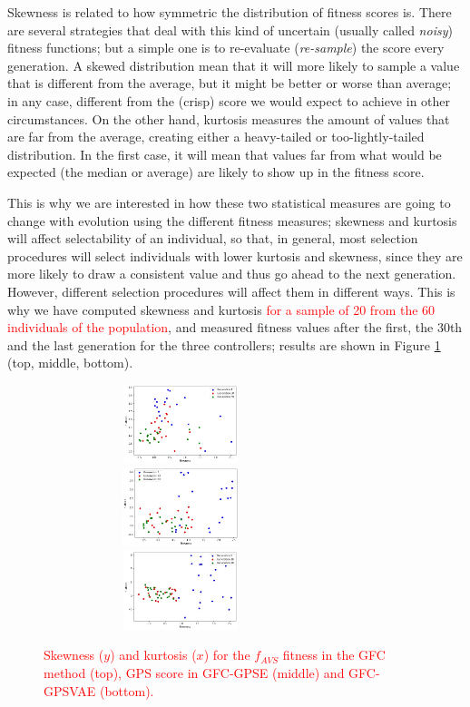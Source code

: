 \documentclass[10pt,journal,compsoc]{IEEEtran}
\begin{document}
Skewness is related to how symmetric the distribution of fitness
scores is. There are several strategies that deal with this kind of
uncertain (usually called {\em noisy}) fitness functions; but a simple
one is to re-evaluate ({\em re-sample}) the score every generation. A
skewed distribution mean that it will more likely to sample a value
that is different from the average, but it might be better or worse
than average; in any case, different from the (crisp) score we would expect to
achieve in other circumstances. On the other hand, kurtosis measures
the amount of values that are far from the average, creating either a
heavy-tailed or too-lightly-tailed distribution. In the first case, it
will mean that values far from what would be expected (the median or average) are likely to
show up in the fitness score.

This is why we are interested in how these two statistical measures
are going to change with evolution using the different fitness measures; skewness and kurtosis will  affect
selectability of an individual, so that, in general, most selection procedures will select
individuals with lower kurtosis and skewness, since they are more
likely to draw a consistent value and thus go ahead to the next
generation. However, different selection procedures will affect them in different ways. This is why we have computed skewness and kurtosis \textcolor{red}{for a sample of 20 from the 60 individuals of the population}, and measured fitness values after the first, the 30th and the last generation for the three controllers;
results are shown in Figure \ref{fig:gfcsk} (top, middle, bottom). 

\begin{figure}[ht]	
	\begin{center}
          \includegraphics[width=8cm, height=2.3cm]{fig/GFC__.jpg}
          \includegraphics[width=8cm, height=2.3cm]{fig/GFCRSE__.jpg}
          \includegraphics[width=8cm, height=2.3cm]{fig/GFCVARSE__.jpg}
		\caption{\textcolor{red}{Skewness ($y$) and kurtosis ($x$)
                  for the $f_{AVS}$ fitness in the  {\sf GFC} method \cite{salem_cig2018} (top), GPS score in {\sf GFC-GPSE} (middle) and {\sf GFC-GPSVAE} (bottom).}}
		\label{fig:gfcsk}
	\end{center}	
\end{figure}
\end{document}
